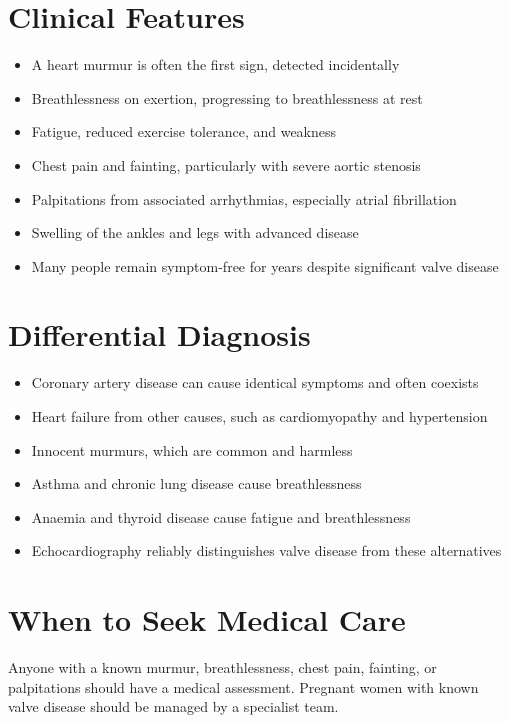 \section*{Clinical Features}
\begin{itemize}
    \item A heart murmur is often the first sign, detected incidentally
    \item Breathlessness on exertion, progressing to breathlessness at rest
    \item Fatigue, reduced exercise tolerance, and weakness
    \item Chest pain and fainting, particularly with severe aortic stenosis
    \item Palpitations from associated arrhythmias, especially atrial fibrillation
    \item Swelling of the ankles and legs with advanced disease
    \item Many people remain symptom-free for years despite significant valve disease
\end{itemize}

\section*{Differential Diagnosis}
\begin{itemize}
    \item Coronary artery disease can cause identical symptoms and often coexists
    \item Heart failure from other causes, such as cardiomyopathy and hypertension
    \item Innocent murmurs, which are common and harmless
    \item Asthma and chronic lung disease cause breathlessness
    \item Anaemia and thyroid disease cause fatigue and breathlessness
    \item Echocardiography reliably distinguishes valve disease from these alternatives
\end{itemize}

\section*{When to Seek Medical Care}
Anyone with a known murmur, breathlessness, chest pain, fainting, or palpitations should have a medical assessment. Pregnant women with known valve disease should be managed by a specialist team.

